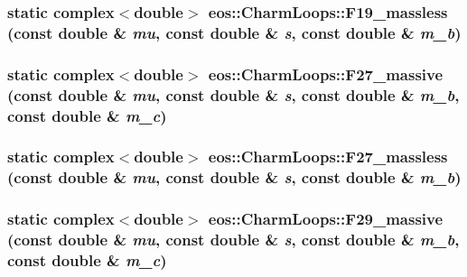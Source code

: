 \label{structeos_1_1CharmLoops_a4ed440c1f33914e6c2e5b825b24e384e}
\hypertarget{structeos_1_1CharmLoops_afbab032d85a4b70b3ea223acf50e8e38}{
\subsubsection[{F19\_\-massless}]{\setlength{\rightskip}{0pt plus 5cm}static complex$<$double$>$ eos::CharmLoops::F19\_\-massless (const double \& {\em mu}, \/  const double \& {\em s}, \/  const double \& {\em m\_\-b})}}
\label{structeos_1_1CharmLoops_afbab032d85a4b70b3ea223acf50e8e38}
\hypertarget{structeos_1_1CharmLoops_a84b926651e9df767d4d3fe0d37c4bdf2}{
\subsubsection[{F27\_\-massive}]{\setlength{\rightskip}{0pt plus 5cm}static complex$<$double$>$ eos::CharmLoops::F27\_\-massive (const double \& {\em mu}, \/  const double \& {\em s}, \/  const double \& {\em m\_\-b}, \/  const double \& {\em m\_\-c})}}
\label{structeos_1_1CharmLoops_a84b926651e9df767d4d3fe0d37c4bdf2}
\hypertarget{structeos_1_1CharmLoops_a9fd74444d72504308c806d91943b2933}{
\subsubsection[{F27\_\-massless}]{\setlength{\rightskip}{0pt plus 5cm}static complex$<$double$>$ eos::CharmLoops::F27\_\-massless (const double \& {\em mu}, \/  const double \& {\em s}, \/  const double \& {\em m\_\-b})}}
\label{structeos_1_1CharmLoops_a9fd74444d72504308c806d91943b2933}
\hypertarget{structeos_1_1CharmLoops_ac670d235f7b371739d54e2c731dac27b}{
\subsubsection[{F29\_\-massive}]{\setlength{\rightskip}{0pt plus 5cm}static complex$<$double$>$ eos::CharmLoops::F29\_\-massive (const double \& {\em mu}, \/  const double \& {\em s}, \/  const double \& {\em m\_\-b}, \/  const double \& {\em m\_\-c})}}
